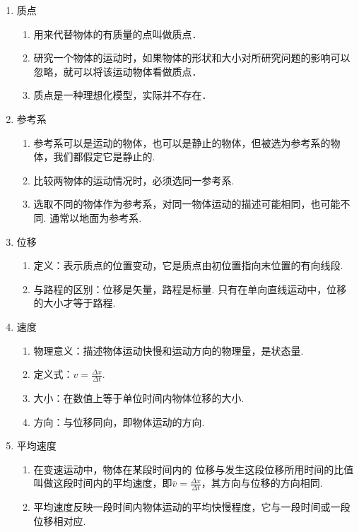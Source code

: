 \documentclass[cn,11pt]{elegantbook}
\begin{document}
      \begin{enumerate}
         \item 质点
         \begin{enumerate}
            \item 用来代替物体的有质量的点叫做质点．
            \item 研究一个物体的运动时，如果物体的形状和大小对所研究问题的影响可以忽略，就可以将该运动物体看做质点．
            \item 质点是一种理想化模型，实际并不存在．
         \end{enumerate}
         \item 参考系
         \begin{enumerate}
            \item 参考系可以是运动的物体，也可以是静止的物体，但被选为参考系的物体，我们都假定它是静止的.
            \item 比较两物体的运动情况时，必须选同一参考系.
            \item 选取不同的物体作为参考系，对同一物体运动的描述可能相同，也可能不同. 通常以地面为参考系.
         \end{enumerate}
         \item 位移
         \begin{enumerate}
            \item 定义：表示质点的位置变动，它是质点由初位置指向末位置的有向线段.
            \item 与路程的区别：位移是矢量，路程是标量. 只有在单向直线运动中，位移的大小才等于路程.   
         \end{enumerate}
         \item 速度
         \begin{enumerate}
            \item 物理意义：描述物体运动快慢和运动方向的物理量，是状态量.
            \item 定义式：$v=\frac{\Delta x}{\Delta t}$.
            \item 大小：在数值上等于单位时间内物体位移的大小.
            \item 方向：与位移同向，即物体运动的方向.
         \end{enumerate}
         \item 平均速度
         \begin{enumerate}
            \item 在变速运动中，物体在某段时间内的 位移与发生这段位移所用时间的比值叫做这段时间内的平均速度，即$\overline{v}=\frac{\Delta x}{\Delta t}$，其方向与位移的方向相同.
            \item 平均速度反映一段时间内物体运动的平均快慢程度，它与一段时间或一段位移相对应.

\end{enumerate}
\end{enumerate}
\end{document}
